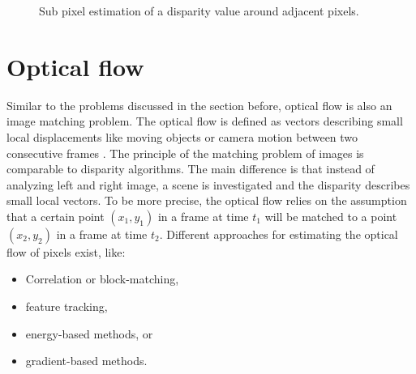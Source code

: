 \begin{figure}[h!]
  \centering
  \caption{Sub pixel estimation of a disparity value around adjacent pixels.}
  \label{fig:sub-pixel-estimation}
\end{figure}

\section{Optical flow}

Similar to the problems discussed in the section before, optical flow is also an image matching problem.
The optical flow is defined as vectors describing small local displacements like moving objects or camera motion between two consecutive frames \citep{cyganek2011introduction, opencv_library}.
The principle of the matching problem of images is comparable to disparity algorithms.
The main difference is that instead of analyzing left and right image, a scene is investigated and the disparity describes small local vectors.
To be more precise, the optical flow relies on the assumption that a certain point $(x_1, y_1)$ in a frame at time $t_1$ will be matched to a point $(x_2, y_2)$ in a frame at time $t_2$.
Different approaches for estimating the optical flow of pixels exist, like:

\begin{itemize}
  \item Correlation or block-matching,
  \item feature tracking,
  \item energy-based methods, or
  \item gradient-based methods.
\end{itemize}

